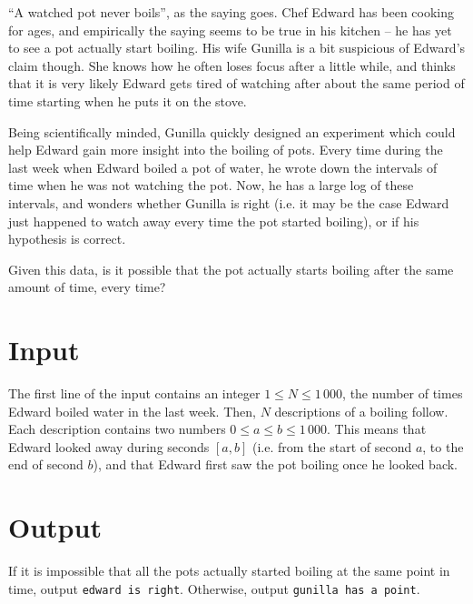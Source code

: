 ``A watched pot never boils'', as the saying goes.
Chef Edward has been cooking for ages, and empirically the saying seems to be true in his kitchen -- he has yet to see a pot actually start boiling.
His wife Gunilla is a bit suspicious of Edward's claim though.
She knows how he often loses focus after a little while, and thinks that it is very likely Edward gets tired of watching after about the same period of time starting when he puts it on the stove.

Being scientifically minded, Gunilla quickly designed an experiment which could help Edward gain more insight into the boiling of pots.
Every time during the last week when Edward boiled a pot of water, he wrote down the intervals of time when he was not watching the pot.
Now, he has a large log of these intervals, and wonders whether Gunilla is right (i.e. it may be the case Edward just happened to watch away every time the pot started boiling), or if his hypothesis is correct.

Given this data, is it possible that the pot actually starts boiling after the same amount of time, every time?

\section*{Input}
The first line of the input contains an integer $1 \le N \le 1\,000$, the number of times Edward boiled water in the last week.
Then, $N$ descriptions of a boiling follow.
Each description contains two numbers $0 \le a \le b \le 1\,000$.
This means that Edward looked away during seconds $[a, b]$ (i.e. from the start of second $a$, to the end of second $b$), and that Edward first saw the pot boiling once he looked back.

\section*{Output}
If it is impossible that all the pots actually started boiling at the same point in time, output \texttt{edward is right}.
Otherwise, output \texttt{gunilla has a point}.
